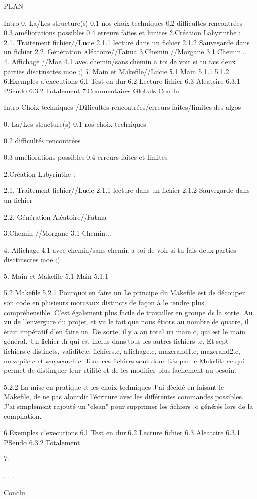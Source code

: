 PLAN

Intro
0. La/Les  structure(s)
0.1 nos choix techniques
 0.2 difficultés rencontrées
0.3 améliorations possibles
0.4 erreurs faites et limites
2.Création Labyrinthe :
2.1. Traitement fichier//Lucie
2.1.1 lecture dans un fichier
2.1.2 Sauvegarde dans un fichier
2.2. Génération Aléatoire//Fatma
3.Chemin //Morgane
3.1 Chemin...
4. Affichage //Moe
4.1 avec chemin/sans chemin a toi de voir si tu fais deux parties disctinsctes moe ;)
5. Main et Makefile//Lucie
5.1 Main
5.1.1
5.1.2
6.Exemples d'executions
6.1 Test en dur
6.2 Lecture fichier
6.3 Aleatoire
6.3.1 PSeudo
6.3.2 Totalement
7.Commentaires Globals
Conclu






Intro
Choix techniques /Difficultés rencontrées/erreurs faites/limites des algos


0. La/Les  structure(s)
0.1 nos choix techniques
 
0.2 difficultés rencontrées

0.3 améliorations possibles
0.4 erreurs faites et limites

2.Création Labyrinthe :

2.1. Traitement fichier//Lucie
2.1.1 lecture dans un fichier
2.1.2 Sauvegarde dans un fichier

2.2. Génération Aléatoire//Fatma

3.Chemin //Morgane
3.1 Chemin...

4. Affichage 
4.1 avec chemin/sans chemin a toi de voir si tu fais deux parties disctinsctes moe ;)

5. Main et Makefile
5.1 Main
5.1.1



5.2 Makefile
5.2.1 Pourquoi en faire un
Le principe du Makefile est de découper son code en plusieurs morceaux distincts de façon à le rendre plus compréhensible.
C'est également plus facile de travailler en groupe de la sorte. 
Au vu de l'envergure du projet, et vu le fait que nous étions au nombre de quatre, il était impératif d'en faire un. 
De sorte, il y a au total un main.c, qui est le main général. Un fichier .h qui est inclus dans tous les autres fichiers .c.  
Et sept fichiers.c distincts, validite.c, fichiers.c, affichage.c, mazerand1.c, mazerand2.c, mazepile.c et waysearch.c.
Tous ces fichiers sont donc liés par le Makefile ce qui permet de distinguer leur utilité et de les modifier plus facilement au besoin.

5.2.2 La mise en pratique et les choix techniques
J'ai décidé en faisant le Makefile, de ne pas alourdir l'écriture avec les différentes commandes possibles.
J'ai simplement rajouté un "clean" pour supprimer les fichiers .o générés lors de la compilation. 



6.Exemples d'executions
6.1 Test en dur
6.2 Lecture fichier
6.3 Aleatoire
6.3.1 PSeudo
6.3.2 Totalement

7.


.
.
.

Conclu
